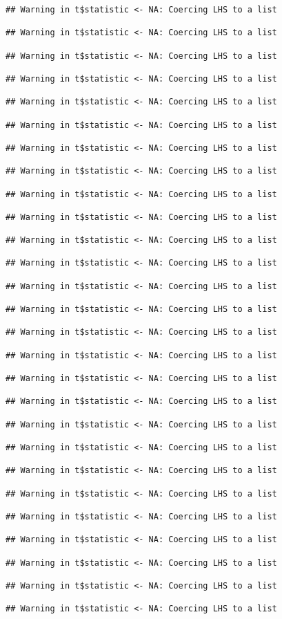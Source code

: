 \documentclass[
]{article}
\begin{document}
\begin{verbatim}
## Warning in t$statistic <- NA: Coercing LHS to a list

## Warning in t$statistic <- NA: Coercing LHS to a list

## Warning in t$statistic <- NA: Coercing LHS to a list

## Warning in t$statistic <- NA: Coercing LHS to a list

## Warning in t$statistic <- NA: Coercing LHS to a list

## Warning in t$statistic <- NA: Coercing LHS to a list

## Warning in t$statistic <- NA: Coercing LHS to a list

## Warning in t$statistic <- NA: Coercing LHS to a list

## Warning in t$statistic <- NA: Coercing LHS to a list

## Warning in t$statistic <- NA: Coercing LHS to a list

## Warning in t$statistic <- NA: Coercing LHS to a list

## Warning in t$statistic <- NA: Coercing LHS to a list

## Warning in t$statistic <- NA: Coercing LHS to a list

## Warning in t$statistic <- NA: Coercing LHS to a list

## Warning in t$statistic <- NA: Coercing LHS to a list

## Warning in t$statistic <- NA: Coercing LHS to a list

## Warning in t$statistic <- NA: Coercing LHS to a list

## Warning in t$statistic <- NA: Coercing LHS to a list

## Warning in t$statistic <- NA: Coercing LHS to a list

## Warning in t$statistic <- NA: Coercing LHS to a list

## Warning in t$statistic <- NA: Coercing LHS to a list

## Warning in t$statistic <- NA: Coercing LHS to a list

## Warning in t$statistic <- NA: Coercing LHS to a list

## Warning in t$statistic <- NA: Coercing LHS to a list

## Warning in t$statistic <- NA: Coercing LHS to a list

## Warning in t$statistic <- NA: Coercing LHS to a list

## Warning in t$statistic <- NA: Coercing LHS to a list


\end{verbatim}
\end{document}
